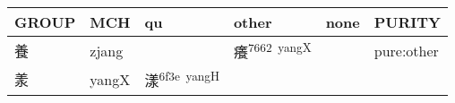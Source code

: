 \documentclass[14pt,a4paper]{scrartcl}
\begin{document}
\begin{longtable}[c]{@{}llllll@{}}
\toprule
\begin{minipage}[b]{0.14\columnwidth}\raggedright\strut
GROUP
\strut\end{minipage} &
\begin{minipage}[b]{0.14\columnwidth}\raggedright\strut
MCH
\strut\end{minipage} &
\begin{minipage}[b]{0.14\columnwidth}\raggedright\strut
qu
\strut\end{minipage} &
\begin{minipage}[b]{0.14\columnwidth}\raggedright\strut
other
\strut\end{minipage} &
\begin{minipage}[b]{0.14\columnwidth}\raggedright\strut
none
\strut\end{minipage} &
\begin{minipage}[b]{0.14\columnwidth}\raggedright\strut
PURITY
\strut\end{minipage}\tabularnewline
\midrule
\endhead
\begin{minipage}[t]{0.14\columnwidth}\raggedright\strut
養
\strut\end{minipage} &
\begin{minipage}[t]{0.14\columnwidth}\raggedright\strut
zjang
\strut\end{minipage} &
\begin{minipage}[t]{0.14\columnwidth}\raggedright\strut
\strut\end{minipage} &
\begin{minipage}[t]{0.14\columnwidth}\raggedright\strut
癢\textsuperscript{7662~yangX}
\strut\end{minipage} &
\begin{minipage}[t]{0.14\columnwidth}\raggedright\strut
\strut\end{minipage} &
\begin{minipage}[t]{0.14\columnwidth}\raggedright\strut
pure:other
\strut\end{minipage}\tabularnewline
\begin{minipage}[t]{0.14\columnwidth}\raggedright\strut
羕
\strut\end{minipage} &
\begin{minipage}[t]{0.14\columnwidth}\raggedright\strut
yangX
\strut\end{minipage} &
\begin{minipage}[t]{0.14\columnwidth}\raggedright\strut
漾\textsuperscript{6f3e~yangH}
\strut\end{minipage} &

\end{longtable}
\end{document}
